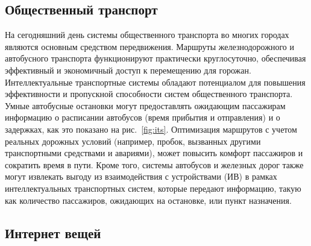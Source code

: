 \subsection*{Общественный транспорт}

На сегодняшний день системы общественного транспорта во многих городах являются основным средством передвижения. Маршруты железнодорожного и автобусного транспорта функционируют практически круглосуточно, обеспечивая эффективный и экономичный доступ к перемещению для горожан. Интеллектуальные транспортные системы обладают потенциалом для повышения эффективности и пропускной способности систем общественного транспорта. Умные автобусные остановки могут предоставлять ожидающим пассажирам информацию о расписании автобусов (время прибытия и отправления) и о задержках, как это показано на рис.~\ref{fig:its}. Оптимизация маршрутов с учетом реальных дорожных условий (например, пробок, вызванных другими транспортными средствами и авариями), может повысить комфорт пассажиров и сократить время в пути. Кроме того, системы автобусов и железных дорог также могут извлекать выгоду из взаимодействия с устройствами  (ИВ) в рамках интеллектуальных транспортных систем, которые передают информацию, такую как количество пассажиров, ожидающих на остановке, или пункт назначения.

\subsection*{Интернет вещей}


